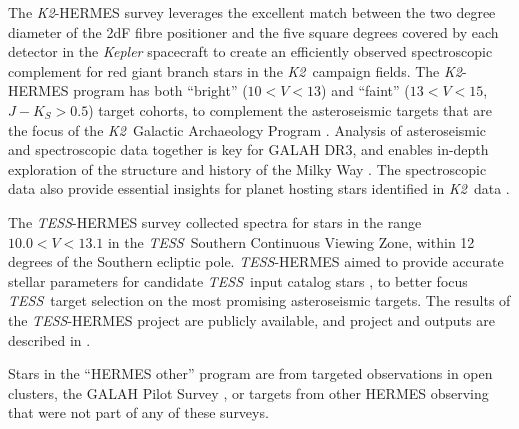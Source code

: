 \documentclass[fleqn,usenatbib,useAMS]{mnras}
\newcommand{\tess}{\textit{TESS}\xspace}
\newcommand{\Ktwo}{\textit{K2}\xspace}
\begin{document}
The \Ktwo-HERMES survey leverages the excellent match between the two degree diameter of the 2dF fibre positioner and the five square degrees covered by each detector in the \textit{Kepler} spacecraft to create an efficiently observed spectroscopic complement for red giant branch stars in the \Ktwo\ campaign fields. The \Ktwo-HERMES program has both ``bright'' ($10<V<13$) and ``faint'' ($13<V<15$, $J-K_S>0.5$) target cohorts, to complement the asteroseismic targets that are the focus of the \Ktwo\ Galactic Archaeology Program \citep{Stello2017}. Analysis of asteroseismic and spectroscopic data together is key for GALAH DR3, and enables in-depth exploration of the structure and history of the Milky Way \citep[e.g.,][]{Sharma2016,Sharma2019}. The spectroscopic data also provide essential insights for planet hosting stars identified in \Ktwo\ data \citep{Wittenmyer2018,Wittenmyer2020}.

The \tess-HERMES survey collected spectra for stars in the range $10.0<V<13.1$ in the \tess\ Southern Continuous Viewing Zone, within 12 degrees of the Southern ecliptic pole. \tess-HERMES aimed to provide accurate stellar parameters for candidate \tess\ input catalog stars \citep{Stassun2019}, to better focus \tess\ target selection on the most promising asteroseismic targets. The results of the \tess-HERMES project are publicly available, and project and outputs are described in \citet{Sharma2018}.

Stars in the ``HERMES other'' program are from targeted observations in open clusters, the GALAH Pilot Survey \citep{Martell2017}, or targets from other HERMES observing that were not part of any of these surveys.
\end{document}

